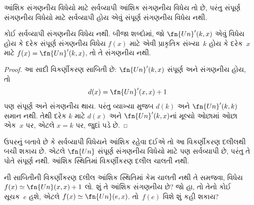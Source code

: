 \documentclass[../../../include/open-logic-section]{subfiles}
\begin{document}

આંશિક સંગણનીય વિધેયો માટે સર્વવ્યાપી આંશિક સંગણનીય વિધેય તો છે,
પરંતુ સંપૂર્ણ સંગણનીય વિધેયો માટે સર્વવ્યાપી હોય એવું સંપૂર્ણ
સંગણનીય વિધેય નથી.

\begin{thm}
કોઈ સર્વવ્યાપી સંગણનીય વિધેય નથી. બીજા શબ્દોમાં, જો
$\fn{Un}'(k, x)$ એવું વિધેય હોય કે દરેક સંપૂર્ણ સંગણનીય વિધેય
$f(x)$ માટે એવી પ્રાકૃતિક સંખ્યા~$k$ હોય કે દરેક~$x$ માટે
$f(x) = \fn{Un}'(k,x)$, તો તે સંગણનીય નથી.
\end{thm}

\begin{proof}
આ સાદી વિકર્ણીકરણ સાબિતી છે: $\fn{Un}'(k,x)$ સંપૂર્ણ અને સંગણનીય
હોય, તો
\[
d(x) = \fn{Un}'(x, x) + 1
\]
પણ સંપૂર્ણ અને સંગણનીય થાય. પરંતુ વ્યાખ્યા મુજબ $d(k)$ અને
$\fn{Un}'(k,k)$ સમાન નથી. તેથી દરેક $k$ માટે $d(x)$ અને
$\fn{Un}'(k, x)$નાં મૂલ્યો ઓછામાં ઓછા એક~$x$ પર, એટલે $x = k$
પર, જુદાં પડે છે.
\end{proof}

\begin{explain}
ઉપરનું  બતાવે છે કે સર્વવ્યાપી વિધેયને
આંશિક રહેવા દઈએ તો આ વિકર્ણીકરણ દલીલથી બચી શકાય છે. એટલે
$\fn{Un}$ સંપૂર્ણ સંગણનીય વિધેયો માટે પણ સર્વવ્યાપી છે, પરંતુ તે
પોતે સંપૂર્ણ નથી. આંશિક સ્થિતિમાં વિકર્ણીકરણ દલીલ ચાલતી નથી.
\end{explain}

\begin{prob}
  ની સાબિતીની વિકર્ણીકરણ દલીલ આંશિક
  સ્થિતિમાં કેમ ચાલતી નથી તે સમજવા, વિધેય
  $f(x) \simeq \fn{Un}(x,x)+1$ લો. શું તે આંશિક સંગણનીય છે?
  જો હા, તો તેનો કોઈ સૂચક~$e$ હશે, એટલે $f(x) \simeq
  \fn{Un}(e,x)$. તો~$f(e)$ વિશે શું કહી શકાય?
\end{prob}
\end{document}
